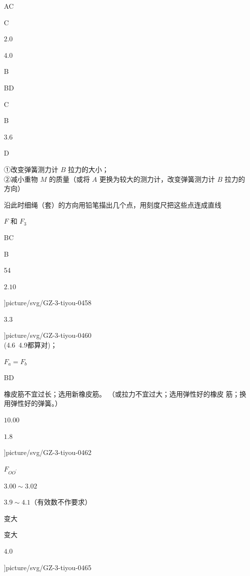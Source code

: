 \item AC
\item C
\item $ 2.0 $
\item 4.0
\item B
\item BD
\item C
\item B
\item $ 3.6 $
\item D
\item ①改变弹簧测力计 $ B $ 拉力的大小； \\ ②减小重物 $ M $ 的质量（或将 $ A $ 更换为较大的测力计，改变弹簧测力计 $ B $ 拉力的方向）
\item 沿此时细绳（套）的方向用铅笔描出几个点，用刻度尺把这些点连成直线
\item $ F $ 和 $ F_{3} $
\item BC
\item B
\item 54
\item $ 2.10 $
\item \linewidth ]{picture/svg/GZ-3-tiyou-0458}
\item $ 3.3 $
\item \par 
\item \linewidth ]{picture/svg/GZ-3-tiyou-0460} \\ (4.6~4.9都算对)；
\item $ F_a=F_b $
\item BD
\item 橡皮筋不宜过长；选用新橡皮筋。 （或拉力不宜过大；选用弹性好的橡皮 筋；换用弹性好的弹簧。）
\item \par 
\item $ 10.00 $
\item $ 1.8 $
\item \linewidth ]{picture/svg/GZ-3-tiyou-0462}
\item $ F_{OO ^{\prime } } $
\item \par 
\item $ 3.00 \sim 3.02 $
\item $ 3.9 \sim 4.1 $（有效数不作要求）
\item 变大
\item 变大
\item $ 4.0 $
\item \linewidth ]{picture/svg/GZ-3-tiyou-0465}
